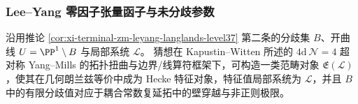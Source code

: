 \subsubsection{Lee--Yang 零因子张量函子与未分歧参数}\label{subsubsec:xi-leyang-zero-divisor-tensor-functor-unramified}

\par

\begin{conjecture}\label{conj:xi-terminal-zm-leyang-kapustin-witten-wall}
沿用推论 \ref{cor:xi-terminal-zm-leyang-langlands-level37} 第二条的分歧集 \(B\)、开曲线 \(U=\PP^1\setminus B\) 与局部系统 \(\mathcal L\)。
猜想在 Kapustin--Witten 所述的 \(4\mathrm d\ \mathcal N=4\) 超对称 Yang--Mills 的拓扑扭曲与边界/线算符框架下，可构造一类范畴对象 \(\mathfrak E(\mathcal L)\)，使其在几何朗兰兹等价中成为 Hecke 特征对象，特征值局部系统为 \(\mathcal L\)，并且 \(B\) 中的有限分歧值对应于耦合常数复延拓中的壁穿越与非正则极限。\cite{KapustinWitten2006GeometricLanglands}
\end{conjecture}


